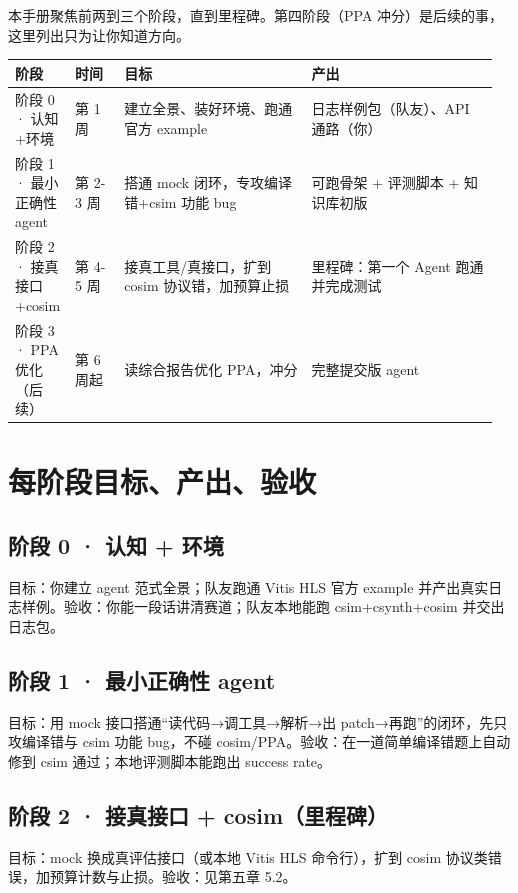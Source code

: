 \documentclass[12pt,a4paper]{ctexbook}
\begin{document}
本手册聚焦前两到三个阶段，直到里程碑。第四阶段（PPA 冲分）是后续的事，这里列出只为让你知道方向。

\begin{longtable}{@{}p{0.10\linewidth}p{0.10\linewidth}p{0.38\linewidth}p{0.38\linewidth}@{}}
\toprule
\textbf{阶段} & \textbf{时间} & \textbf{目标} & \textbf{产出} \\
\midrule
\endhead
阶段 0 · 认知+环境 & 第 1 周 & 建立全景、装好环境、跑通官方 example & 日志样例包（队友）、API 通路（你） \\
阶段 1 · 最小正确性 agent & 第 2-3 周 & 搭通 mock 闭环，专攻编译错+csim 功能 bug & 可跑骨架 + 评测脚本 + 知识库初版 \\
阶段 2 · 接真接口+cosim & 第 4-5 周 & 接真工具/真接口，扩到 cosim 协议错，加预算止损 & 里程碑：第一个 Agent 跑通并完成测试 \\
阶段 3 · PPA 优化（后续） & 第 6 周起 & 读综合报告优化 PPA，冲分 & 完整提交版 agent \\
\bottomrule
\end{longtable}

\section{每阶段目标、产出、验收}

\subsection*{阶段 0 · 认知 + 环境}

目标：你建立 agent 范式全景；队友跑通 Vitis HLS 官方 example 并产出真实日志样例。验收：你能一段话讲清赛道；队友本地能跑 csim+csynth+cosim 并交出日志包。

\subsection*{阶段 1 · 最小正确性 agent}

目标：用 mock 接口搭通“读代码→调工具→解析→出 patch→再跑”的闭环，先只攻编译错与 csim 功能 bug，不碰 cosim/PPA。验收：在一道简单编译错题上自动修到 csim 通过；本地评测脚本能跑出 success rate。

\subsection*{阶段 2 · 接真接口 + cosim（里程碑）}

目标：mock 换成真评估接口（或本地 Vitis HLS 命令行），扩到 cosim 协议类错误，加预算计数与止损。验收：见第五章 5.2。
\end{document}
